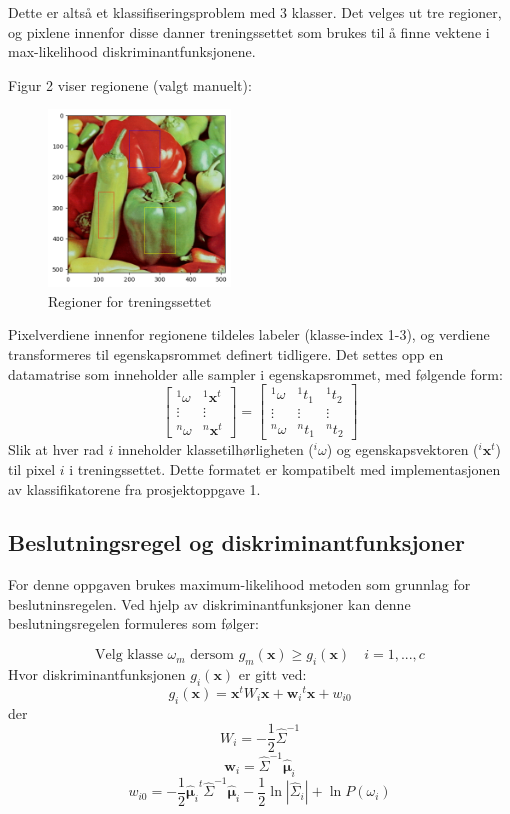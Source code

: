 \documentclass{article}
\begin{document}
Dette er altså et klassifiseringsproblem med 3 klasser. Det velges ut tre regioner,
og pixlene innenfor disse danner treningssettet som brukes til å finne vektene i max-likelihood diskriminantfunksjonene.

Figur 2 viser regionene (valgt manuelt):
\begin{figure}[h]
    \centering
    \includegraphics[width=4.84cm]{test_regions}
    \caption{Regioner for treningssettet}
\end{figure}

Pixelverdiene innenfor regionene tildeles labeler (klasse-index 1-3), og 
verdiene transformeres til egenskapsrommet definert tidligere. Det settes opp en datamatrise
som inneholder alle sampler i egenskapsrommet, med følgende form:
$$
\begin{bmatrix}
    {}^1\omega & {}^1\pmb{x}^t\\
    \vdots & \vdots \\
    {}^n\omega & {}^n\pmb{x}^t
\end{bmatrix}
=
\begin{bmatrix}
    {}^1\omega & {}^1t_1 & {}^1t_{2}\\
    \vdots & \vdots & \vdots \\
    {}^n\omega & {}^nt_1 & {}^nt_{2}
\end{bmatrix}
$$
Slik at hver rad $i$ inneholder klassetilhørligheten (${}^i\omega$) og egenskapsvektoren (${}^i\pmb{x}^t$) til pixel $i$ i treningssettet.
Dette formatet er kompatibelt med implementasjonen av klassifikatorene fra prosjektoppgave 1.

\subsection*{Beslutningsregel og diskriminantfunksjoner}
For denne oppgaven brukes maximum-likelihood metoden som grunnlag for beslutninsregelen.
Ved hjelp av diskriminantfunksjoner kan denne beslutningsregelen formuleres som følger:

\[ \text{Velg klasse } \omega_m \text{ dersom } g_m(\pmb{x}) \geq g_i(\pmb{x}) \quad i = 1,..., c\]
    Hvor diskriminantfunksjonen $g_i(\pmb{x})$ er gitt ved:
\[ g_i(\pmb{x}) = \pmb{x}^tW_i\pmb{x} + {\pmb{w}_i}^t\pmb{x} + w_{i0}\]
der
\[W_i = -\frac{1}{2}\hat{\Sigma}^{-1}\]
\[\pmb{w}_i = \hat{\Sigma}^{-1} \hat{\pmb{\mu}}_i\]
\[w_{i0} = -\frac{1}{2}{\hat{\pmb{\mu}}_i}^t\hat{\Sigma}^{-1}\hat{\pmb{\mu}}_i -\frac{1}{2} \ln{|\hat{\Sigma}_i|} + \ln{P(\omega_i)}\]
\end{document}
